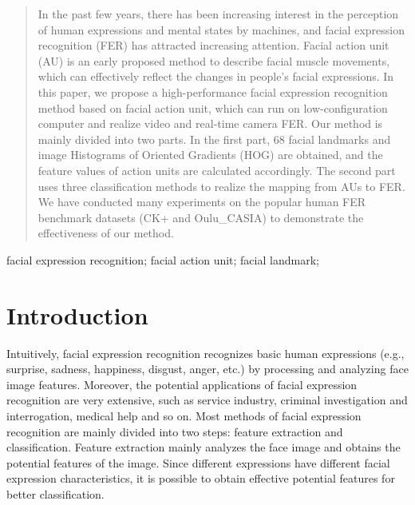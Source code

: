 \documentclass[10pt, conference, compsocconf]{IEEEtran}
\begin{document}
\maketitle


\begin{abstract}
In the past few years, there has been increasing interest in the perception of human expressions and mental states by machines, and facial expression recognition (FER) has attracted increasing attention. Facial action unit (AU) is an early proposed method to describe facial muscle movements, which can effectively reflect the changes in people's facial expressions. In this paper, we propose a high-performance facial expression recognition method based on facial action unit, which can run on low-configuration computer and realize video and real-time camera FER. Our method is mainly divided into two parts. In the first part, 68 facial landmarks and image Histograms of Oriented Gradients (HOG) are obtained, and the feature values of action units are calculated accordingly. The second part uses three classification methods to realize the mapping from AUs to FER. We have conducted many experiments on the popular human FER benchmark datasets (CK+ and Oulu\_CASIA) to demonstrate the effectiveness of our method.
\end{abstract}

\begin{IEEEkeywords}
facial expression recognition; facial action unit; facial landmark;

\end{IEEEkeywords}


%
\IEEEpeerreviewmaketitle



\section{Introduction}
Intuitively, facial expression recognition recognizes basic human expressions\cite{Peter2009Computation} (e.g., surprise, sadness, happiness, disgust, anger, etc.) by processing and analyzing face image features. Moreover, the potential applications of facial expression recognition are very extensive, such as service industry, criminal investigation and interrogation, medical help\cite{Girard2013Social} and so on. Most methods of facial expression recognition are mainly divided into two steps: feature extraction and classification. Feature extraction mainly analyzes the face image and obtains the potential features of the image. Since different expressions have different facial expression characteristics, it is possible to obtain effective potential features for better classification.
\end{document}

